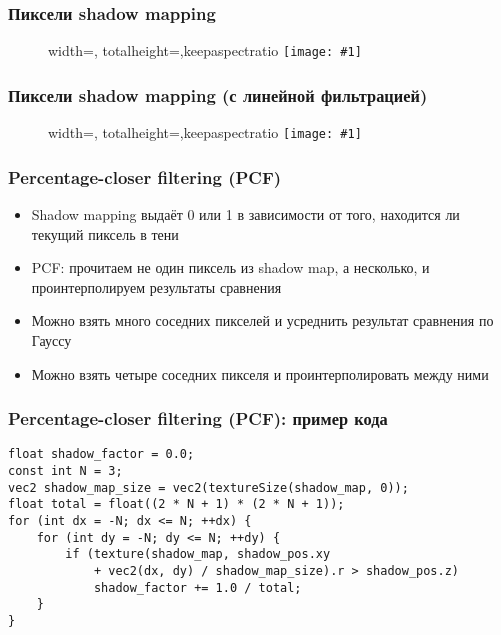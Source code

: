 \documentclass{beamer}
\newcommand{\slideimage}[1]{
  \begin{figure}
    \begin{adjustbox}{width=\textwidth, totalheight=\textheight-2\baselineskip-2\baselineskip,keepaspectratio}
      \texttt{[image: \#1]}
    \end{adjustbox}
  \end{figure}
}
\begin{document}
\begin{frame}[fragile]
\frametitle{Пиксели shadow mapping}
\slideimage{shadow_map_nearest.png}
\end{frame}

\begin{frame}[fragile]
\frametitle{Пиксели shadow mapping (с линейной фильтрацией)}
\slideimage{shadow_map_linear.png}
\end{frame}

\begin{frame}[fragile]
\frametitle{Percentage-closer filtering (PCF)}
\begin{itemize}
\item Shadow mapping выдаёт 0 или 1 в зависимости от того, находится ли текущий пиксель в тени
\pause
\item PCF: прочитаем не один пиксель из shadow map, а несколько, и проинтерполируем результаты сравнения
\pause
\item Можно взять много соседних пикселей и усреднить результат сравнения по Гауссу
\item Можно взять четыре соседних пикселя и проинтерполировать между ними
\end{itemize}
\end{frame}

\begin{frame}[fragile]
\frametitle{Percentage-closer filtering (PCF): пример кода}
\fontsize{10pt}{10pt}
\begin{verbatim}
float shadow_factor = 0.0;
const int N = 3;
vec2 shadow_map_size = vec2(textureSize(shadow_map, 0));
float total = float((2 * N + 1) * (2 * N + 1));
for (int dx = -N; dx <= N; ++dx) {
    for (int dy = -N; dy <= N; ++dy) {
        if (texture(shadow_map, shadow_pos.xy
            + vec2(dx, dy) / shadow_map_size).r > shadow_pos.z)
            shadow_factor += 1.0 / total;
    }
}
\end{verbatim}
\end{frame}
\end{document}
